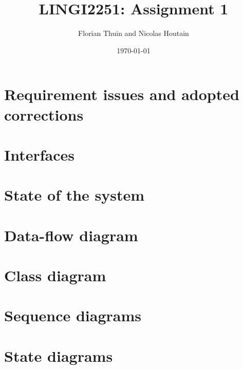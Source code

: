 \documentclass[11pt, a4paper]{article}
\title{LINGI2251: Assignment 1}
\author{Florian Thuin and Nicolas Houtain}
\date{\today}
\begin{document}
\maketitle
\tableofcontents

\section{Requirement issues and adopted corrections}


\section{Interfaces}


\section{State of the system}



\section{Data-flow diagram}



\section{Class diagram}



\section{Sequence diagrams}



\section{State diagrams}

\end{document}
